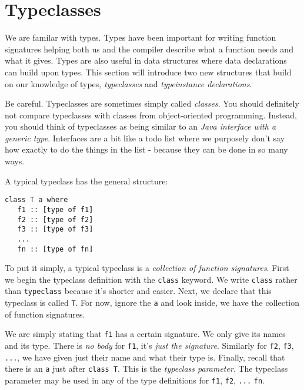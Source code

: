 
\chapter{Typeclasses}

We are familar with types. Types have been important for writing function 
signatures helping both us and the compiler describe what a function needs and what it gives.
Types are also useful in data structures where data declarations can build upon types. 	
This section will introduce two new structures that build on our knowledge of types, 
\textit{typeclasses} and \textit{typeinstance declarations}. 


Be careful. Typeclasses are sometimes simply called \textit{classes}. 
You should definitely not compare typeclasses with 
classes from object-oriented programming. Instead, you should think of typeclasses 
as being similar to an \textit{Java interface with a generic type}. 
Interfaces are a bit like a todo list where we purposely don't say how exactly 
to do the things in the list - because they can be done in so many ways. 

A typical typeclass has the general structure:

\begin{lstlisting}
class T a where
   f1 :: [type of f1]
   f2 :: [type of f2]
   f3 :: [type of f3]
   ...
   fn :: [type of fn]
\end{lstlisting}

To put it simply, a typical typeclass is a \textit{collection of function signatures}.
First we begin the typeclass definition with the \lstinline{class} keyword.
We write \lstinline{class} rather than \lstinline{typeclass} because it's shorter and easier.
Next, we declare that this typeclass is called \lstinline{T}. 
For now, ignore the \lstinline{a} and look inside, we have the collection of function signatures. 

We are simply stating that \lstinline{f1}
has a certain signature. We only give its names and its type. 
There is \textit{no body} for \lstinline{f1}, it's \textit{just the signature}. 
Similarly for \lstinline{f2}, \lstinline{f3}, \lstinline{...}, 
we have given just their name and what their type is. 
Finally, recall that there is an \lstinline{a} just after \lstinline{class T}. 
This is the \textit{typeclass parameter}. The typeclass parameter may be used in any of the 
type definitions for \lstinline{f1}, \lstinline{f2}, \lstinline{...} \lstinline{fn}.


